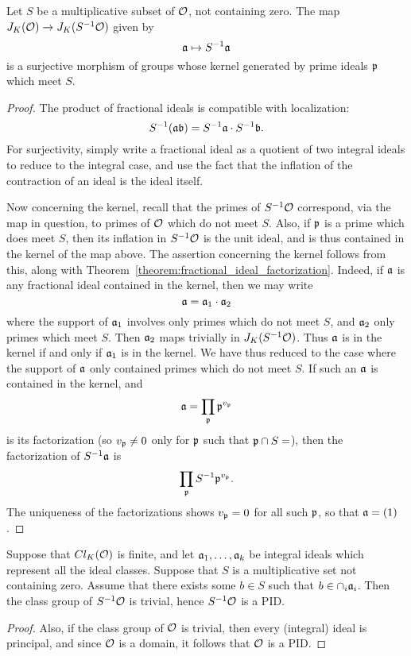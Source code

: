 \begin{proposition}
  Let $S$ be a multiplicative subset of $\mathcal{O}$, not containing zero.
  The map $J_{K}(\mathcal{O}) \to J_{K}(S^{-1}\mathcal{O})$ given by
  \[ \mathfrak{a} \mapsto S^{-1} \mathfrak{a} \]
  is a surjective morphism of groups whose kernel generated by prime ideals $\mathfrak{p}$ which meet $S$.
\end{proposition}
\begin{proof}
  The product of fractional ideals is compatible with localization:
  \[ S^{-1}(\mathfrak{a} \mathfrak{b}) = S^{-1}\mathfrak{a} \cdot S^{-1} \mathfrak{b}. \]
  For surjectivity, simply write a fractional ideal as a quotient of two integral ideals to reduce to the integral case, and use the fact that the inflation of the contraction of an ideal is the ideal itself.

  Now concerning the kernel, recall that the primes of $S^{-1}\mathcal{O}$ correspond, via the map in question, to primes of $\mathcal{O}$ which do not meet $S$.
  Also, if $\mathfrak{p}$ is a prime which does meet $S$, then its inflation in $S^{-1}\mathcal{O}$ is the unit ideal, and is thus contained in the kernel of the map above.
  The assertion concerning the kernel follows from this, along with Theorem~\ref{theorem:fractional_ideal_factorization}.
  Indeed, if $\mathfrak{a}$ is any fractional ideal contained in the kernel, then we may write
  \[ \mathfrak{a} = \mathfrak{a}_{1} \cdot \mathfrak{a}_{2} \]
  where the support of $\mathfrak{a}_{1}$ involves only primes which do not meet $S$, and $\mathfrak{a}_{2}$ only primes which meet $S$.
  Then $\mathfrak{a}_{2}$ maps trivially in $J_{K}(S^{-1}\mathcal{O})$.
  Thus $\mathfrak{a}$ is in the kernel if and only if $\mathfrak{a}_{1}$ is in the kernel.
  We have thus reduced to the case where the support of $\mathfrak{a}$ only contained primes which do not meet $S$.
  If such an $\mathfrak{a}$ is contained in the kernel, and
  \[ \mathfrak{a} = \prod_{\mathfrak{p}} \mathfrak{p}^{v_{\mathfrak{p}}} \]
  is its factorization (so $v_{\mathfrak{p}} \neq 0$ only for $\mathfrak{p}$ such that $\pfrak \cap S = \empty$), then the factorization of $S^{-1}\mathfrak{a}$ is
  \[ \prod_{\mathfrak{p}} S^{-1}\mathfrak{p}^{v_{\mathfrak{p}}}.\]
  The uniqueness of the factorizations shows $v_{\mathfrak{p}} = 0$ for all such $\mathfrak{p}$, so that $\mathfrak{a} = (1)$.
\end{proof}

\begin{proposition}
  Suppose that $Cl_{K}(\mathcal{O})$ is finite, and let $\mathfrak{a}_{1},\ldots,\mathfrak{a}_{k}$ be integral ideals which represent all the ideal classes.
  Suppose that $S$ is a multiplicative set not containing zero.
  Assume that there exists some $b \in S$ such that $b \in \cap_{i} \mathfrak{a}_{i}$.
  Then the class group of $S^{-1}\mathcal{O}$ is trivial, hence $S^{-1}\mathcal{O}$ is a PID.
\end{proposition}
\begin{proof}
  Also, if the class group of $\mathcal{O}$ is trivial, then every (integral) ideal is principal, and since $\mathcal{O}$ is a domain, it follows that $\mathcal{O}$ is a PID.
\end{proof}

